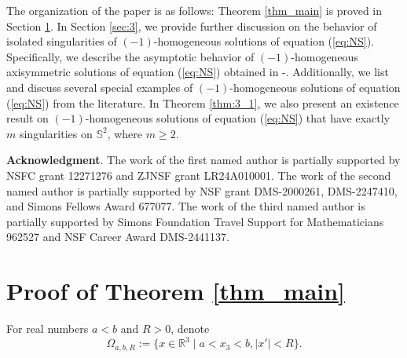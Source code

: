 \documentclass[12pt]{article}
\newcommand{\bS}{\mathbb{S}}
\begin{document}
The organization of the paper is as follows: Theorem \ref{thm_main} is proved in Section \ref{sec:2}. In Section \ref{sec:3}, we provide further discussion on the behavior of isolated singularities of $(-1)$-homogeneous solutions of equation (\ref{eq:NS}). Specifically, we describe the asymptotic behavior of $(-1)$-homogeneous axisymmetric solutions of equation (\ref{eq:NS}) obtained in \cite{LLY1}-\cite{LLY3}. Additionally, we list and discuss several special examples of $(-1)$-homogeneous solutions of equation (\ref{eq:NS}) from the literature. In Theorem \ref{thm:3_1}, we also present an existence result on $(-1)$-homogeneous solutions of equation (\ref{eq:NS}) that have exactly $m$ singularities on $\bS^2$, where $m\ge 2$. 

\medskip

\noindent
{\bf Acknowledgment}. The work of the first named author is partially supported by NSFC grant 12271276 and ZJNSF grant LR24A010001. The work of the second named author is partially supported by NSF grant DMS-2000261, DMS-2247410, and Simons Fellows Award 677077. The work of the third named author is partially supported by %
Simons Foundation Travel Support for Mathematicians 962527 and NSF Career Award DMS-2441137.%

\section{Proof of Theorem \ref{thm_main}}\label{sec:2}

For real numbers $a<b$ and $R>0$, denote
\begin{equation}
	\Omega_{a, b, R} := \{x\in \mathbb{R}^3 \mid a<x_3<b, |x'|<R\}. 
\end{equation}
\end{document}
